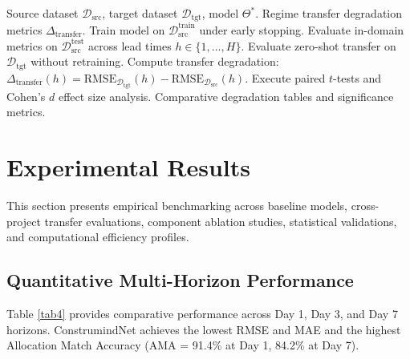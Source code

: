 \documentclass[pdflatex,sn-mathphys,Numbered]{sn-jnl}%
\begin{document}
\begin{algorithm}[h]
\caption{Formalized Cross-Project Regime Transfer Protocol}\label{alg3}
\begin{algorithmic}[1]
\Require Source dataset $\mathcal{D}_{\text{src}}$, target dataset $\mathcal{D}_{\text{tgt}}$, model $\Theta^*$.
\Ensure Regime transfer degradation metrics $\Delta_{\text{transfer}}$.
\State Train model on $\mathcal{D}_{\text{src}}^{\text{train}}$ under early stopping.
\State Evaluate in-domain metrics on $\mathcal{D}_{\text{src}}^{\text{test}}$ across lead times $h \in \{1, \dots, H\}$.
\State Evaluate zero-shot transfer on $\mathcal{D}_{\text{tgt}}$ without retraining.
\State Compute transfer degradation: $\Delta_{\text{transfer}}(h) = \text{RMSE}_{\mathcal{D}_{\text{tgt}}}(h) - \text{RMSE}_{\mathcal{D}_{\text{src}}}(h)$.
\State Execute paired $t$-tests and Cohen's $d$ effect size analysis.
\State \Return Comparative degradation tables and significance metrics.
\end{algorithmic}
\end{algorithm}

\section{Experimental Results}\label{sec5}
This section presents empirical benchmarking across baseline models, cross-project transfer evaluations, component ablation studies, statistical validations, and computational efficiency profiles.

\subsection{Quantitative Multi-Horizon Performance}
Table \ref{tab4} provides comparative performance across Day 1, Day 3, and Day 7 horizons. ConstrumindNet achieves the lowest RMSE and MAE and the highest Allocation Match Accuracy (AMA = 91.4\% at Day 1, 84.2\% at Day 7).
\end{document}
